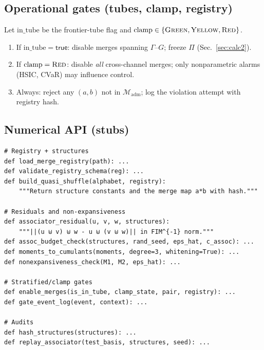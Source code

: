 \subsection*{Operational gates (tubes, clamp, registry)}
\begin{definition}\label{def:gates}
\emph{}
Let $\mathrm{in\_tube}$ be the frontier-tube flag and $\mathrm{clamp}\in\{\textsc{Green},\textsc{Yellow},\textsc{Red}\}$.
\begin{enumerate}[leftmargin=*]
\item If $\mathrm{in\_tube}=\textsf{true}$: disable merges spanning $\Gamma$–$G$; freeze $\Pi$ (Sec.~\ref{sec:calc2}).
\item If $\mathrm{clamp}=\textsc{Red}$: disable \emph{all} cross-channel merges; only nonparametric alarms (HSIC, CVaR) may influence control.
\item Always: reject any $(a,b)$ not in $\mathcal M_{\mathrm{adm}}$; log the violation attempt with registry hash.
\end{enumerate}
\end{definition}

\subsection*{Numerical API (stubs)}
\begin{lstlisting}
# Registry + structures
def load_merge_registry(path): ...
def validate_registry_schema(reg): ...
def build_quasi_shuffle(alphabet, registry):
    """Return structure constants and the merge map a*b with hash."""

# Residuals and non-expansiveness
def associator_residual(u, v, w, structures):
    """||(u ⊎ v) ⊎ w - u ⊎ (v ⊎ w)|| in FIM^{-1} norm."""
def assoc_budget_check(structures, rand_seed, eps_hat, c_assoc): ...
def moments_to_cumulants(moments, degree=3, whitening=True): ...
def nonexpansiveness_check(M1, M2, eps_hat): ...

# Stratified/clamp gates
def enable_merges(is_in_tube, clamp_state, pair, registry): ...
def gate_event_log(event, context): ...

# Audits
def hash_structures(structures): ...
def replay_associator(test_basis, structures, seed): ...
\end{lstlisting}

